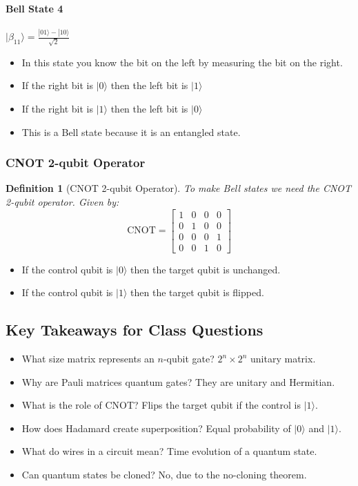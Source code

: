 \documentclass{article}
\newtheorem{definition}[theorem]{Definition}
\begin{document}
\paragraph{Bell State 4} \(|\beta_{11}\rangle = \frac{|01\rangle - |10\rangle}{\sqrt{2}}\)
\begin{itemize}
    \item In this state you know the bit on the left by measuring the bit on the right.
    \item If the right bit is \(|0\rangle\) then the left bit is \(|1\rangle\)
    \item If the right bit is \(|1\rangle\) then the left bit is \(|0\rangle\)
    \item This is a Bell state because it is an entangled state.
\end{itemize}

\subsubsection{CNOT 2-qubit Operator}
\begin{definition}[CNOT 2-qubit Operator]
To make Bell states we need the CNOT 2-qubit operator. Given by:
\[
\text{CNOT} = \begin{bmatrix} 1 & 0 & 0 & 0 \\ 0 & 1 & 0 & 0 \\ 0 & 0 & 0 & 1 \\ 0 & 0 & 1 & 0 \end{bmatrix}
\]
\end{definition}

\begin{itemize}
    \item If the control qubit is \(|0\rangle\) then the target qubit is unchanged.
    \item If the control qubit is \(|1\rangle\) then the target qubit is flipped.
\end{itemize}

\subsection{Key Takeaways for Class Questions}
\begin{conceptbox}
\begin{itemize}
    \item What size matrix represents an \(n\)-qubit gate? \(2^n \times 2^n\) unitary matrix.
    \item Why are Pauli matrices quantum gates? They are unitary and Hermitian.
    \item What is the role of CNOT? Flips the target qubit if the control is \(|1\rangle\).
    \item How does Hadamard create superposition? Equal probability of \(|0\rangle\) and \(|1\rangle\).
    \item What do wires in a circuit mean? Time evolution of a quantum state.
    \item Can quantum states be cloned? No, due to the no-cloning theorem.
\end{itemize}
\end{conceptbox}
\end{document}
